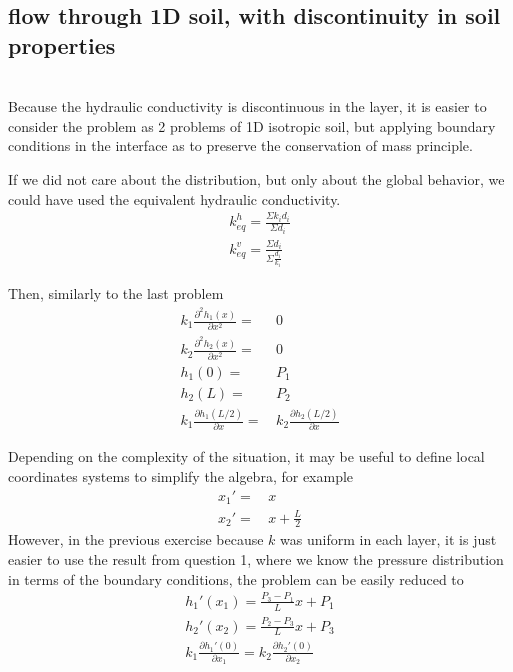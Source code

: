 \documentclass[a4paper, 11pt,article,oneside]{memoir}%
\begin{document}
\subsection{flow through 1D soil, with discontinuity in soil properties}\\
Because the hydraulic conductivity is discontinuous in the layer, it is easier to consider the problem as 2 problems of 1D isotropic soil, but applying boundary conditions in the interface as to preserve the conservation of mass principle.
\begin{note}
If we did not care about the distribution, but only about the global behavior, we could have used the equivalent hydraulic conductivity.
\begin{gather*}
k_{eq}^h=\frac{\Sigma k_id_i}{\Sigma d_i}\\
k_{eq}^v=\frac{\Sigma d_i}{\Sigma \frac{d_i}{k_i}}\
\end{gather*}
\end{note}
Then, similarly to the last problem 
\begin{align*}
k_1\frac{\partial^2 h_1(x)}{\partial x^2}=&\,0 \\
k_2\frac{\partial^2 h_2(x)}{\partial x^2}=&\,0 \\
h_1(0)=&\,P_1\\
h_2(L)=&\,P_2 \\
k_1\frac{\partial h_1(L/2)}{\partial x}=&\,k_2\frac{\partial h_2(L/2)}{\partial x}
\end{align*}
\begin{note}
Depending on the complexity of the situation, it may be useful to define local coordinates systems to simplify the algebra, for example
\begin{align*}
x_1'=&\,x\\
x_2'=&\,x+\frac{L}{2}
\end{align*}
However, in the previous exercise because $k$ was uniform in each layer, it is just easier to use the result from question 1, where we know the pressure distribution in terms of  the boundary conditions, the problem can be easily reduced to 
\begin{align*}
h_1'(x_1)=\frac{P_3-P_1}{L}x+P_1\\
h_2'(x_2)=\frac{P_2-P_3}{L}x+P_3\\
k_1\frac{\partial h_1'(0)}{\partial x_1}=k_2\frac{\partial h_2'(0)}{\partial x_2}
\end{align*}
\end{note}
\end{document}
